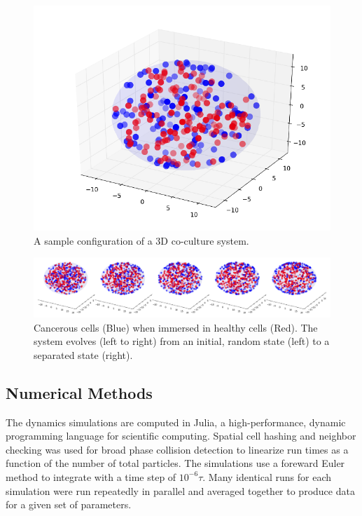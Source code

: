 \documentclass[aps,prb,twocolumn,groupedaddress,nofootinbib,floatfix]{revtex4}
\begin{document}
\begin{figure}
  \includegraphics[width=1.0\columnwidth]{3dconf.png}
  \caption[3dconf]
    {A sample configuration of a 3D co-culture system.}
   \label{fig:3dconf}
\end{figure}

\begin{figure}[t]
  \includegraphics[width=\textwidth]{separation.png}
  \caption[separation]
    {Cancerous cells (Blue) when immersed in healthy cells (Red). The system
    evolves (left to right) from an initial, random state (left) to a separated 
state (right).}
   \label{fig:separation}
\end{figure}

\subsection*{Numerical Methods}

The dynamics simulations are computed in Julia, a high-performance, dynamic 
programming language for scientific computing. Spatial cell hashing and neighbor 
checking was used for broad phase collision detection to linearize run times 
as a function of the number of total particles. The simulations use a foreward 
Euler method to integrate with a time step of $10^{-6}\tau$. 
Many identical runs for each  simulation were run repeatedly in parallel and 
averaged together to produce data for a given set of parameters.
\end{document}
